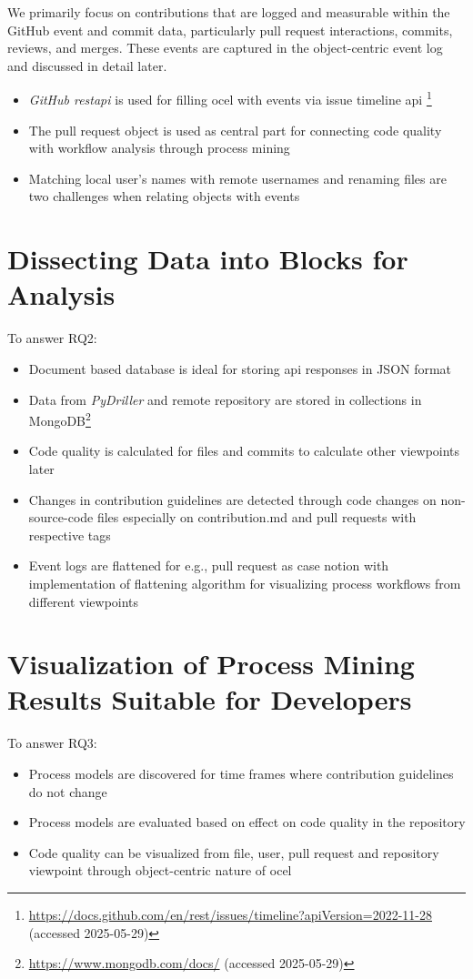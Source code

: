 We primarily focus on contributions that are logged and measurable within the GitHub event and commit data, particularly pull request interactions, commits, reviews, and merges. These events are captured in the object-centric event log and discussed in detail later.

\begin{itemize}
	\item \emph{GitHub \ac{restapi}} is used for filling \ac{ocel} with events via issue timeline \ac{api} \footnote{\url{https://docs.github.com/en/rest/issues/timeline?apiVersion=2022-11-28} (accessed 2025-05-29)}
	\item The pull request object is used as central part for connecting code quality with workflow analysis through process mining
	\item Matching local user's names with remote usernames and renaming files are two challenges when relating objects with events
\end{itemize}

\section{Dissecting Data into Blocks for Analysis}
To answer RQ2:
\begin{itemize}
	\item Document based database is ideal for storing \ac{api} responses in JSON format
	\item Data from \emph{PyDriller} and remote repository are stored in  collections in MongoDB\footnote{\url{https://www.mongodb.com/docs/} (accessed 2025-05-29)}
	\item Code quality is calculated for files and commits to calculate other viewpoints later
	\item Changes in contribution guidelines are detected through code changes on non-source-code files especially on contribution.md and pull requests with respective tags
	\item Event logs are flattened for e.g., pull request as case notion with implementation of flattening algorithm for visualizing process workflows from different viewpoints
\end{itemize}

\section{Visualization of Process Mining Results Suitable for Developers}
To answer RQ3:
\begin{itemize}
	\item Process models are discovered for time frames where contribution guidelines do not change
	\item Process models are evaluated based on effect on code quality in the repository
	\item Code quality can be visualized from file, user, pull request and repository viewpoint through object-centric nature of \ac{ocel}
\end{itemize}